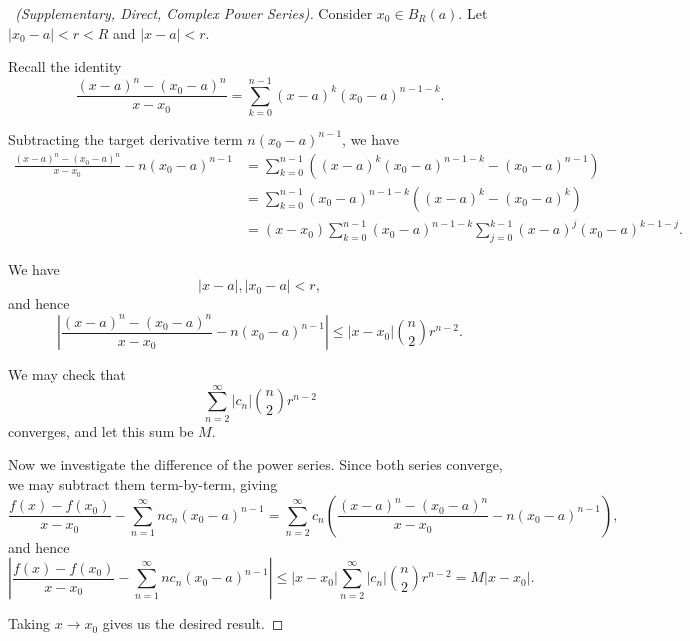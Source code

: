 \documentclass[11pt]{article}
\numberwithin{equation}{section}
\theoremstyle{definition}
\theoremstyle{remark}
\newcommand{\pqty}[1]{\left(#1\right)}
\newcommand{\abs}[1]{\left|#1\right|}
\begin{document}
\begin{proof}[\proofname\ (Supplementary, Direct, Complex Power Series)]
    Consider \(x_0 \in B_R\pqty{a}\). Let \(\abs{x_0 - a} < r < R\) and \(\abs{x - a} < r\).

    Recall the identity
    \[
        \frac{\pqty{x - a}^n - \pqty{x_0 - a}^n}{x - x_0} = \sum_{k = 0}^{n - 1} \pqty{x - a}^k \pqty{x_0 - a}^{n - 1 - k}.
    \]

    Subtracting the target derivative term \(n \pqty{x_0 - a}^{n - 1}\), we have
    \begin{align*}
        \frac{\pqty{x - a}^n - \pqty{x_0 - a}^n}{x - x_0} - n \pqty{x_0 - a}^{n - 1} &= \sum_{k = 0}^{n - 1} \pqty{\pqty{x - a}^k \pqty{x_0 - a}^{n - 1 - k} - \pqty{x_0 - a}^{n - 1}} \\
        &= \sum_{k = 0}^{n - 1} \pqty{x_0 - a}^{n - 1 - k} \pqty{\pqty{x - a}^k - \pqty{x_0 - a}^k} \\
        &= \pqty{x - x_0} \sum_{k = 0}^{n - 1} \pqty{x_0 - a}^{n - 1 - k} \sum_{j = 0}^{k - 1} \pqty{x - a}^{j} \pqty{x_0 - a}^{k - 1 - j}.
    \end{align*}

    We have
    \[
        \abs{x - a}, \abs{x_0 - a} < r,
    \]
    and hence
    \[
        \abs{\frac{\pqty{x - a}^n - \pqty{x_0 - a}^n}{x - x_0} - n \pqty{x_0 - a}^{n - 1}} \leq \abs{x - x_0} \binom{n}{2} r^{n - 2}.
    \]

    We may check that
    \[
        \sum_{n = 2}^{\infty} \abs{c_n} \binom{n}{2} r^{n - 2}
    \]
    converges, and let this sum be \(M\).
    
    Now we investigate the difference of the power series. Since both series converge, we may subtract them term-by-term, giving
    \[
        \frac{f\pqty{x} - f\pqty{x_0}}{x - x_0} - \sum_{n = 1}^{\infty} n c_n \pqty{x_0 - a}^{n - 1} = \sum_{n = 2}^{\infty} c_n \pqty{\frac{\pqty{x - a}^n - \pqty{x_0 - a}^n}{x - x_0} - n \pqty{x_0 - a}^{n - 1}},
    \]
    and hence
    \[
        \abs{\frac{f\pqty{x} - f\pqty{x_0}}{x - x_0} - \sum_{n = 1}^{\infty} n c_n \pqty{x_0 - a}^{n - 1}} \leq \abs{x - x_0} \sum_{n = 2}^{\infty} \abs{c_n} \binom{n}{2} r^{n - 2} = M \abs{x - x_0}.
    \]

    Taking \(x \to x_0\) gives us the desired result.
\end{proof}
\end{document}
